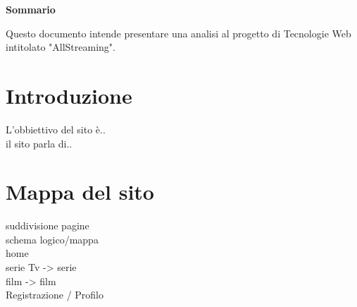 

\newpage

\vspace*{0.5cm} %
\begin{center}

\textbf{{\Large{Sommario}}}

Questo documento intende presentare una analisi al progetto di Tecnologie Web intitolato "AllStreaming".


\vspace*{0.2cm} %

\end{center}




\newpage

\tableofcontents %

\let\cleardoublepage\clearpage %


\listoffigures




\newpage


\section{Introduzione}
L'obbiettivo del sito è..\\
il sito parla di..\\


\section{Mappa del sito}
suddivisione pagine\\
schema logico/mappa\\

home\\
serie Tv -> serie\\
film -> film\\
Registrazione / Profilo \\

